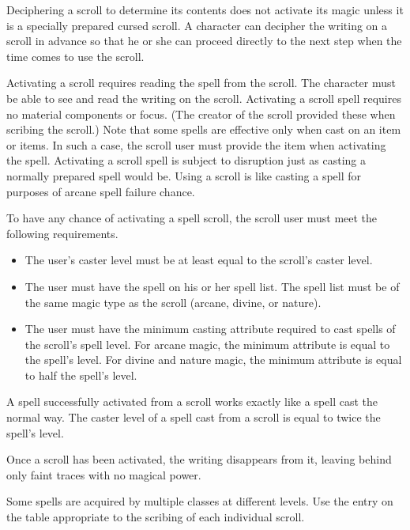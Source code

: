 Deciphering a scroll to determine its contents does not activate its magic unless it is a specially prepared cursed scroll. A character can decipher the writing on a scroll in advance so that he or she can proceed directly to the next step when the time comes to use the scroll.

 Activating a scroll requires reading the spell from the scroll. The character must be able to see and read the writing on the scroll. Activating a scroll spell requires no material components or focus. (The creator of the scroll provided these when scribing the scroll.) Note that some spells are effective only when cast on an item or items. In such a case, the scroll user must provide the item when activating the spell. Activating a scroll spell is subject to disruption just as casting a normally prepared spell would be. Using a scroll is like casting a spell for purposes of arcane spell failure chance.

To have any chance of activating a spell scroll, the scroll user must meet the following requirements.
\begin{itemize}
    \item The user's caster level must be at least equal to the scroll's caster level.
    \item The user must have the spell on his or her spell list. The spell list must be of the same magic type as the scroll (arcane, divine, or nature).
    \item The user must have the minimum casting attribute required to cast spells of the scroll's spell level. For arcane magic, the minimum attribute is equal to the spell's level. For divine and nature magic, the minimum attribute is equal to half the spell's level.
\end{itemize}

 A spell successfully activated from a scroll works exactly like a spell cast the normal way. The caster level of a spell cast from a scroll is equal to twice the spell's level.

Once a scroll has been activated, the writing disappears from it, leaving behind only faint traces with no magical power.

 Some spells are acquired by multiple classes at different levels. Use the entry on the table appropriate to the scribing of each individual scroll.

